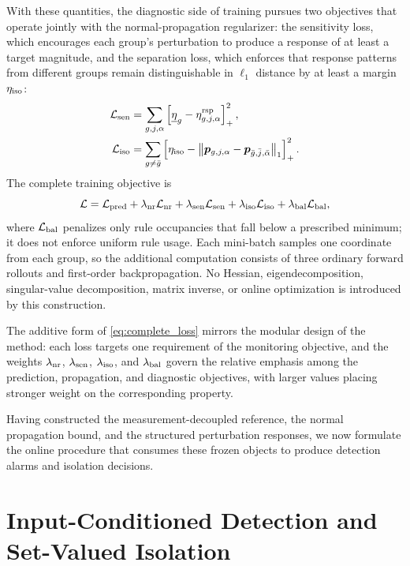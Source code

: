 \documentclass[journal]{IEEEtran}
\newcommand{\norm}[1]{\left\lVert #1\right\rVert}
\newcommand{\1}{\bm 1}
\begin{document}
With these quantities, the diagnostic side of training pursues two objectives
that operate jointly with the normal-propagation regularizer: the sensitivity
loss, which encourages each group's perturbation to produce a response of at
least a target magnitude, and the separation loss, which enforces that
response patterns from different groups remain distinguishable in $\ell_1$
distance by at least a margin $\eta_{\rm iso}$:
\begin{equation}
\begin{aligned}
\mathcal L_{\rm sen}
&=\sum_{g,j,\alpha}
\left[\underline{\eta}_g-\eta_{g,j,\alpha}^{\rm rsp}\right]_+^2,\\
\mathcal L_{\rm iso}
&=\sum_{g\ne\bar g}
\left[
\eta_{\rm iso}
-\norm{\bm p_{g,j,\alpha}
-\bm p_{\bar g,\bar j,\bar\alpha}}_1
\right]_+^2.
\end{aligned}
\label{eq:response_losses}
\end{equation}
The complete training objective is
\begin{equation}
\mathcal L=
\mathcal L_{\rm pred}
+\lambda_{\rm nr}\mathcal L_{\rm nr}
+\lambda_{\rm sen}\mathcal L_{\rm sen}
+\lambda_{\rm iso}\mathcal L_{\rm iso}
+\lambda_{\rm bal}\mathcal L_{\rm bal},
\label{eq:complete_loss}
\end{equation}
where $\mathcal L_{\rm bal}$ penalizes only rule occupancies that fall below a
prescribed minimum; it does not enforce uniform rule usage. Each mini-batch
samples one coordinate from each group, so the additional computation consists
of three ordinary forward rollouts and first-order backpropagation. No
Hessian, eigendecomposition, singular-value decomposition, matrix inverse, or
online optimization is introduced by this construction.

The additive form of \eqref{eq:complete_loss} mirrors the modular design of
the method: each loss targets one requirement of the monitoring objective, and
the weights $\lambda_{\rm nr}$, $\lambda_{\rm sen}$, $\lambda_{\rm iso}$, and
$\lambda_{\rm bal}$ govern the relative emphasis among the prediction,
propagation, and diagnostic objectives, with larger values placing stronger
weight on the corresponding property.

Having constructed the measurement-decoupled reference, the normal propagation
bound, and the structured perturbation responses, we now formulate the online
procedure that consumes these frozen objects to produce detection alarms and
isolation decisions.

\section{Input-Conditioned Detection and Set-Valued Isolation}
\end{document}
